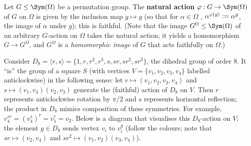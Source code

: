 \begin{example}\label{eg:natural_action}
    Let $G \leq \Sym(\Omega)$ be a permutation group. The \textbf{natural action} $\varphi : G \to \Sym(\Omega)$ of $G$ on $\Omega$ is given by the inclusion map $g \mapsto g$ (so that for $\alpha \in \Omega$ , $\added{4}{\alpha^{\varphi(g)}} := \alpha^g$, the image of $\alpha$ under $g$); this is faithful. (Note that the image $G^\Omega \leq \Sym(\Omega)$ of an arbitrary $G$-action on $\Omega$ takes the natural action; it yields a homomorphism $G \to G^\Omega$, and $G^\Omega$ is a \textit{homomorphic image} of $G$ that acts faithfully on $\Omega$.)
\end{example}

\begin{example}\label{eg:action_D8_on_square}
    Consider $D_8 = \langle r,s \rangle = \{1,r,r^2,r^3,s,sr,sr^2,sr^3\}$, the dihedral group of order 8. It ``is'' the  group of a square $S$ (with vertices $V = \{v_1,v_2,v_3,v_4\}$ labelled anticlockwise) in the following sense: let $r \mapsto (v_1,v_2,v_3,v_4)$ and $s \mapsto (v_1,v_4)(v_2,v_3)$ generate the (faithful) action of $D_8$ on $V$. Then $r$ represents anticlockwise rotation by $\pi/2$ and $s$ represents horizontal reflection; the product in $D_8$ mimics composition of these symmetries. For example, $v_4^{sr} = (v_4^s)^r = v_1^r = v_2$. Below is a diagram that visualises this $D_8$-action on $V$; the element $g \in D_8$ sends vertex $v_i$ to $v_i^g$ (follow the colours; note that $sr \mapsto (v_2,v_4)$ and $sr^2 \mapsto (v_1,v_2)(v_3,v_4)$).


\end{example}
